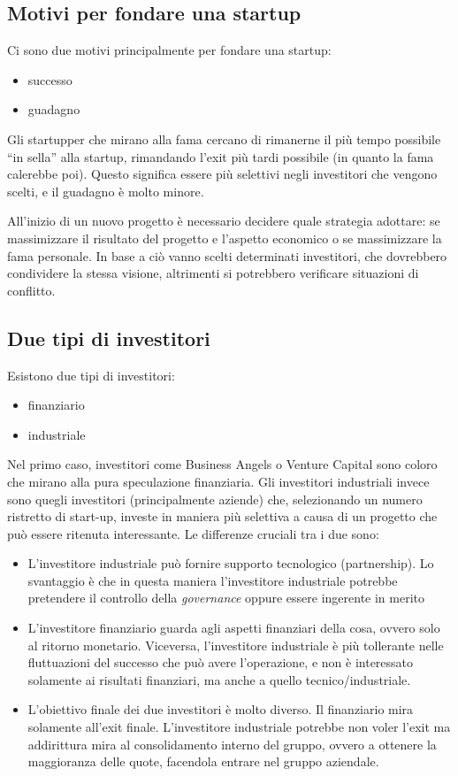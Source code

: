 \subsection{Motivi per fondare una startup}
Ci sono due motivi principalmente per fondare una startup:
\begin{itemize}
 \item successo
 \item guadagno
\end{itemize}

Gli startupper che mirano alla fama cercano di rimanerne il più tempo possibile
``in sella'' alla startup, rimandando l'exit più tardi possibile (in quanto la
fama calerebbe poi). Questo significa essere più selettivi negli investitori
che vengono scelti, e il guadagno è molto minore.

All'inizio di un nuovo progetto è necessario decidere quale strategia adottare:
se massimizzare il risultato del progetto e l'aspetto economico o se
massimizzare la fama personale. In base a ciò vanno scelti determinati
investitori, che dovrebbero condividere la stessa visione, altrimenti si
potrebbero verificare situazioni di conflitto.

\subsection{Due tipi di investitori}

Esistono due tipi di investitori:
\begin{itemize}
 \item finanziario
 \item industriale
\end{itemize}
Nel primo caso, investitori come Business Angels o Venture Capital sono coloro
che mirano alla pura speculazione finanziaria. Gli investitori industriali
invece sono quegli investitori (principalmente aziende) che, selezionando un
numero ristretto di start-up, investe in maniera più selettiva a causa di un
progetto che può essere ritenuta interessante. Le differenze cruciali tra i due
sono:
\begin{itemize}
 \item L'investitore industriale può fornire supporto tecnologico
(partnership). Lo svantaggio è che in questa maniera l'investitore industriale
potrebbe pretendere il controllo della \textit{governance} oppure essere
ingerente in merito
 \item L'investitore finanziario guarda agli aspetti finanziari della cosa,
ovvero solo al ritorno monetario. Viceversa, l'investitore industriale è più
tollerante nelle fluttuazioni del successo che può avere l'operazione, e non è
interessato solamente ai risultati finanziari, ma anche a quello
tecnico/industriale.
 \item L'obiettivo finale dei due investitori è molto diverso. Il finanziario
mira solamente all'exit finale. L'investitore industriale potrebbe non voler
l'exit ma addirittura mira al consolidamento interno del gruppo, ovvero
a ottenere la maggioranza delle quote, facendola entrare nel gruppo aziendale.
\end{itemize}

